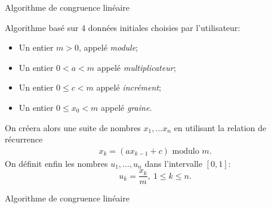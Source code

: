 \documentclass[ignorenonframetext,]{beamer}
\newenvironment{Shaded}{\begin{snugshade}}{\end{snugshade}}
\newcommand{\CommentTok}[1]{\textcolor[rgb]{0.56,0.35,0.01}{\textit{#1}}}
\newcommand{\ControlFlowTok}[1]{\textcolor[rgb]{0.13,0.29,0.53}{\textbf{#1}}}
\newcommand{\DecValTok}[1]{\textcolor[rgb]{0.00,0.00,0.81}{#1}}
\newcommand{\KeywordTok}[1]{\textcolor[rgb]{0.13,0.29,0.53}{\textbf{#1}}}
\newcommand{\NormalTok}[1]{#1}
\newcommand{\OperatorTok}[1]{\textcolor[rgb]{0.81,0.36,0.00}{\textbf{#1}}}
\newcommand{\OtherTok}[1]{\textcolor[rgb]{0.56,0.35,0.01}{#1}}
\newcommand{\StringTok}[1]{\textcolor[rgb]{0.31,0.60,0.02}{#1}}
\begin{document}
\begin{frame}{Algorithme de congruence linéaire}
\protect\hypertarget{algorithme-de-congruence-linuxe9aire}{}

Algorithme basé sur 4 données initiales choisies par l'utilisateur:

\begin{itemize}
\item Un entier $m > 0$, appelé \textit{module};
\item Un entier $0 < a < m$  appelé \textit{multiplicateur};
\item Un entier $0 \leq c < m$ appelé \textit{incrément};
\item Un entier $0 \leq x_0 < m$ appelé \textit{graine}.
\end{itemize}\pause

On créera alors une suite de nombres \(x_1,\dots x_n\) en utilisant la
relation de récurrence \begin{align*}
x_k = (a x_{k-1} + c) \text{ modulo }m. 
\end{align*}\pause On définit enfin les nombres \(u_1,\dots,u_n\) dans
l'intervalle \([0, 1]\): \[u_k = \frac{x_k}{m},~1\leq k \leq n.\]

\end{frame}

\begin{frame}[fragile]{Algorithme de congruence linéaire}
\protect\hypertarget{algorithme-de-congruence-linuxe9aire-1}{}

\begin{Shaded}
\end{Shaded}

\end{frame}
\end{document}
